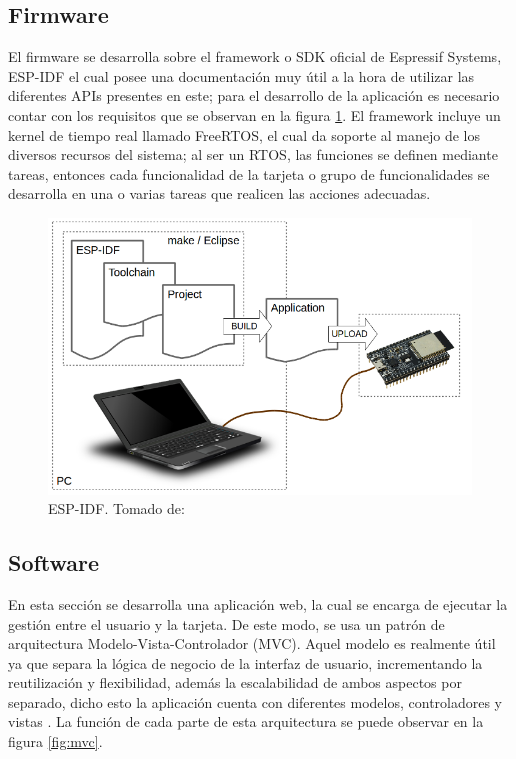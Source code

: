 \subsection{Firmware}

El firmware se desarrolla sobre el framework o SDK oficial de Espressif Systems, ESP-IDF el cual posee una documentación \cite{ES} muy útil a la hora de utilizar las diferentes APIs presentes en este; para el desarrollo de la aplicación es necesario contar con los requisitos que se observan en la figura \ref{fig:what-you-need}. El framework incluye un kernel de tiempo real llamado FreeRTOS, el cual da soporte al manejo de los diversos recursos del sistema; al ser un RTOS, las funciones se definen mediante tareas, entonces cada funcionalidad de la tarjeta o grupo de funcionalidades se desarrolla en una o varias tareas que realicen las acciones adecuadas.\\

\begin{figure}[!t]
	\centering
	\caption{ESP-IDF. Tomado de: \cite{ES}}
	\label{fig:what-you-need}
	\includegraphics[width=0.7\linewidth]{Imagenes/what-you-need}
\end{figure}

\subsection{Software}

En esta sección se desarrolla una aplicación web, la cual se encarga de ejecutar la gestión entre el usuario y la tarjeta. De este modo, se usa un patrón de arquitectura Modelo-Vista-Controlador (MVC). Aquel modelo es realmente útil ya que separa la lógica de negocio de la interfaz de usuario, incrementando la reutilización y flexibilidad, además la escalabilidad de ambos aspectos por separado, dicho esto la aplicación cuenta con diferentes modelos, controladores y vistas \cite{MVC1}. La función de cada parte de esta arquitectura se puede observar en la figura \ref{fig:mvc}.\\

